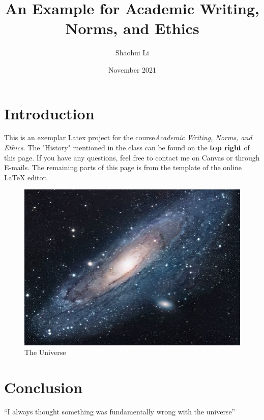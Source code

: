 \documentclass{article}
\title{An Example for Academic Writing, Norms, and Ethics}
\author{Shaohui Li}
\date{November 2021}
\begin{document}
\maketitle

\section{Introduction}
This is an exemplar Latex project for the course\emph{Academic Writing, Norms, and Ethics}. The "History" mentioned in the class can be found on the \textbf{top right} of this page. If you have any questions, feel free to contact me on Canvas or through E-mails. The remaining parts of this page is from the template of the online {\LaTeX} editor.

\begin{figure}[h!]
\centering
\includegraphics[scale=1.7]{universe}
\caption{The Universe}
\label{fig:universe}
\end{figure}

\section{Conclusion}
``I always thought something was fundamentally wrong with the universe'' \citep{adams1995hitchhiker}



\end{document}
